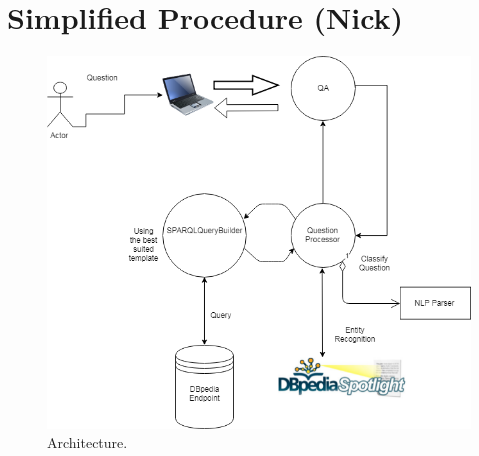 \documentclass[runningheads]{llncs}
\begin{document}
\section{Simplified Procedure (Nick)} 
\begin{figure}
	\includegraphics[width=\textwidth]{Architecture.PNG}
	
	\caption{Architecture.}
	\label{fig1} 
\end{figure}
\end{document}
